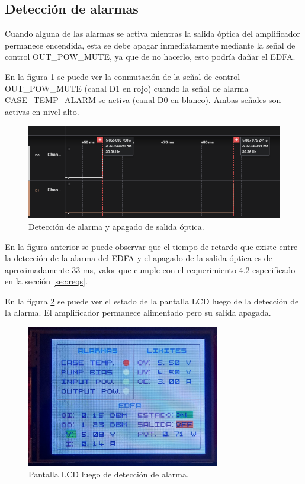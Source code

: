 \subsection{Detección de alarmas}

Cuando alguna de las alarmas se activa mientras la salida óptica del amplificador permanece encendida, esta se debe apagar inmediatamente mediante la señal de control OUT\_POW\_MUTE, ya que de no hacerlo, esto podría dañar el EDFA.

En la figura \ref{fig:detecAlarm2} se puede ver la conmutación de la señal de control OUT\_POW\_MUTE (canal D1 en rojo) cuando la señal de alarma CASE\_TEMP\_ALARM se activa (canal D0 en blanco). Ambas señales son activas en nivel alto.

\begin{figure}[H]
\centering
\includegraphics[width=1\textwidth]{./Figures/detecAlarm2.png}
\caption{Detección de alarma y apagado de salida óptica.}
\label{fig:detecAlarm2}
\end{figure}

En la figura anterior se puede observar que el tiempo de retardo que existe entre la detección de la alarma del EDFA y el apagado de la salida óptica es de aproximadamente 33 ms, valor que cumple con el requerimiento 4.2 especificado en la sección \ref{sec:reqs}.

En la figura \ref{fig:detecAlarm} se puede ver el estado de la pantalla LCD luego de la detección de la alarma. El amplificador permanece alimentado pero su salida apagada.

\begin{figure}[H]
\centering
\includegraphics[width=0.75\textwidth]{./Figures/detecAlarm.jpg}
\caption{Pantalla LCD luego de detección de alarma.}
\label{fig:detecAlarm}
\end{figure}

